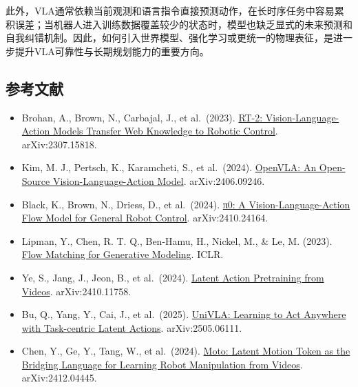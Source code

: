 此外，VLA通常依赖当前观测和语言指令直接预测动作，在长时序任务中容易累积误差；当机器人进入训练数据覆盖较少的状态时，模型也缺乏显式的未来预测和自我纠错机制。因此，如何引入世界模型、强化学习或更统一的物理表征，是进一步提升VLA可靠性与长期规划能力的重要方向。

\FloatBarrier
{}
\hypertarget{ux53c2ux8003ux6587ux732e-152}{%
\subsection{参考文献}\label{ux53c2ux8003ux6587ux732e-152}}

\vspace{0.25em}
\begin{itemize}
\tightlist
\item
  Brohan, A., Brown, N., Carbajal, J., et al.~(2023). \href{https://arxiv.org/abs/2307.15818}{RT-2: Vision-Language-Action Models Transfer Web Knowledge to Robotic Control}. arXiv:2307.15818.
\item
  Kim, M. J., Pertsch, K., Karamcheti, S., et al.~(2024). \href{https://arxiv.org/abs/2406.09246}{OpenVLA: An Open-Source Vision-Language-Action Model}. arXiv:2406.09246.
\item
  Black, K., Brown, N., Driess, D., et al.~(2024). \href{https://arxiv.org/abs/2410.24164}{π0: A Vision-Language-Action Flow Model for General Robot Control}. arXiv:2410.24164.
\item
  Lipman, Y., Chen, R. T. Q., Ben-Hamu, H., Nickel, M., \& Le, M. (2023). \href{https://arxiv.org/abs/2210.02747}{Flow Matching for Generative Modeling}. ICLR.
\item
  Ye, S., Jang, J., Jeon, B., et al.~(2024). \href{https://arxiv.org/abs/2410.11758}{Latent Action Pretraining from Videos}. arXiv:2410.11758.
\item
  Bu, Q., Yang, Y., Cai, J., et al.~(2025). \href{https://arxiv.org/abs/2505.06111}{UniVLA: Learning to Act Anywhere with Task-centric Latent Actions}. arXiv:2505.06111.
\item
  Chen, Y., Ge, Y., Tang, W., et al.~(2024). \href{https://arxiv.org/abs/2412.04445}{Moto: Latent Motion Token as the Bridging Language for Learning Robot Manipulation from Videos}. arXiv:2412.04445.
\end{itemize}

\clearpage
